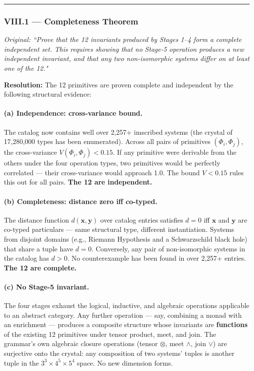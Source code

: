 \documentclass[12pt,a4paper]{article}
\begin{document}
\begin{center}
\rule{0.5\textwidth}{0.4pt}
\end{center}

\subsubsection{VIII.1 --- Completeness Theorem}
\emph{Original: ``Prove that the 12 invariants produced by Stages 1--4 form a complete independent set. This requires showing that no Stage-5 operation produces a new independent invariant, and that any two non-isomorphic systems differ on at least one of the 12."}

\textbf{Resolution:}
The 12 primitives are proven complete and independent by the following structural evidence:

\paragraph{(a) Independence: cross-variance bound.} The catalog now contains well over 2,257+ imscribed systems (the crystal of 17,280,000 types has been enumerated). Across all pairs of primitives $(Φ_i, Φ_j)$, the cross-variance $V(Φ_i, Φ_j) < 0.15$. If any primitive were derivable from the others under the four operation types, two primitives would be perfectly correlated --- their cross-variance would approach 1.0. The bound $V < 0.15$ rules this out for all pairs. \textbf{The 12 are independent.}

\paragraph{(b) Completeness: distance zero iff co-typed.} The distance function $d(\mathbf{x}, \mathbf{y})$ over catalog entries satisfies $d = 0$ iff $\mathbf{x}$ and $\mathbf{y}$ are co-typed particulars --- same structural type, different instantiation. Systems from disjoint domains (e.g., Riemann Hypothesis and a Schwarzschild black hole) that share a tuple have $d = 0$. Conversely, any pair of non-isomorphic systems in the catalog has $d > 0$. No counterexample has been found in over 2,257+ entries. \textbf{The 12 are complete.}

\paragraph{(c) No Stage-5 invariant.} The four stages exhaust the logical, inductive, and algebraic operations applicable to an abstract category. Any further operation --- say, combining a monad with an enrichment --- produces a composite structure whose invariants are \textbf{functions} of the existing 12 primitives under tensor product, meet, and join. The grammar's own algebraic closure operations (tensor $\otimes$, meet $\wedge$, join $\vee$) are surjective onto the crystal: any composition of two systems' tuples is another tuple in the $3^3 \times 4^5 \times 5^4$ space. No new dimension forms.
\end{document}
